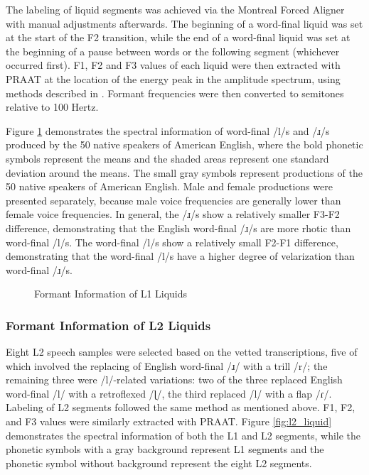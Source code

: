 The labeling of liquid segments was achieved via the Montreal Forced Aligner with manual adjustments afterwards. The beginning of a word-final liquid was set at the start of the F2 transition, while the end of a word-final liquid was set at the beginning of a pause between words or the following segment (whichever occurred first). F1, F2 and F3 values of each liquid were then extracted with PRAAT at the location of the energy peak in the amplitude spectrum, using methods described in \citep{De_Jong_2009}. Formant frequencies were then converted to semitones relative to 100 Hertz. 

Figure \ref{fig:l1_liquid} demonstrates the spectral information of word-final /l/s and /ɹ/s produced by the 50 native speakers of American English, where the bold phonetic symbols represent the means and the shaded areas represent one standard deviation around the means. The small gray symbols represent productions of the 50 native speakers of American English. Male and female productions were presented separately, because male voice frequencies are generally lower than female voice frequencies. In general, the /ɹ/s show a relatively smaller F3-F2 difference, demonstrating that the English word-final /ɹ/s are more rhotic than word-final /l/s. The word-final /l/s show a relatively small F2-F1 difference, demonstrating that the word-final /l/s have a higher degree of velarization than word-final /ɹ/s. 

\begin{figure}[h]
  \figSpace
    \centering
        
    \caption{Formant Information of L1 Liquids}
    \label{fig:l1_liquid}
  \figSpace
\end{figure}

\subsubsection{Formant Information of L2 Liquids}

Eight L2 speech samples were selected based on the vetted transcriptions, five of which involved the replacing of English word-final /ɹ/ with a trill /r/; the remaining three were /l/-related variations: two of the three replaced English word-final /l/ with a retroflexed /ɭ/, the third replaced /l/ with a flap /ɾ/. Labeling of L2 segments followed the same method as mentioned above. F1, F2, and F3 values were similarly extracted with PRAAT. Figure \ref{fig:l2_liquid} demonstrates the spectral information of both the L1 and L2 segments, while the phonetic symbols with a gray background represent L1 segments and the phonetic symbol without background represent the eight L2 segments. 

